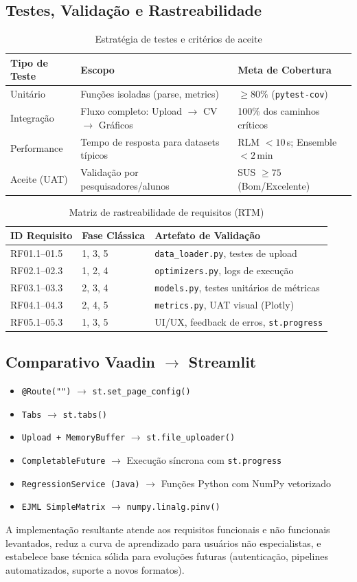 \documentclass[12pt,a4paper]{article}
\begin{document}
\subsection{Testes, Validação e Rastreabilidade}
\begin{table}[H]
\centering
\caption{Estratégia de testes e critérios de aceite}
\begin{tabularx}{\textwidth}{l X X}
\toprule
\textbf{Tipo de Teste} & \textbf{Escopo} & \textbf{Meta de Cobertura} \\
\midrule
Unitário & Funções isoladas (parse, metrics) & $\ge 80\%$ (\texttt{pytest-cov}) \\
Integração & Fluxo completo: Upload $\rightarrow$ CV $\rightarrow$ Gráficos & 100\% dos caminhos críticos \\
Performance & Tempo de resposta para datasets típicos & RLM $< 10\,$s; Ensemble $< 2\,$min \\
Aceite (UAT) & Validação por pesquisadores/alunos & SUS $\ge 75$ (Bom/Excelente) \\
\bottomrule
\end{tabularx}
\end{table}

\begin{table}[H]
\centering
\caption{Matriz de rastreabilidade de requisitos (RTM)}
\begin{tabularx}{\textwidth}{l l X}
\toprule
\textbf{ID Requisito} & \textbf{Fase Clássica} & \textbf{Artefato de Validação} \\
\midrule
RF01.1–01.5 & 1, 3, 5 & \texttt{data\_loader.py}, testes de upload \\
RF02.1–02.3 & 1, 2, 4 & \texttt{optimizers.py}, logs de execução \\
RF03.1–03.3 & 2, 3, 4 & \texttt{models.py}, testes unitários de métricas \\
RF04.1–04.3 & 2, 4, 5 & \texttt{metrics.py}, UAT visual (Plotly) \\
RF05.1–05.3 & 1, 3, 5 & UI/UX, feedback de erros, \texttt{st.progress} \\
\bottomrule
\end{tabularx}
\end{table}

\subsection{Comparativo Vaadin $\rightarrow$ Streamlit}
\begin{itemize}[leftmargin=1.5cm]
    \item \texttt{@Route("")} $\rightarrow$ \texttt{st.set\_page\_config()}
    \item \texttt{Tabs} $\rightarrow$ \texttt{st.tabs()}
    \item \texttt{Upload + MemoryBuffer} $\rightarrow$ \texttt{st.file\_uploader()}
    \item \texttt{CompletableFuture} $\rightarrow$ Execução síncrona com \texttt{st.progress}
    \item \texttt{RegressionService (Java)} $\rightarrow$ Funções Python com NumPy vetorizado
    \item \texttt{EJML SimpleMatrix} $\rightarrow$ \texttt{numpy.linalg.pinv()}
\end{itemize}

A implementação resultante atende aos requisitos funcionais e não funcionais levantados, reduz a curva de aprendizado para usuários não especialistas, e estabelece base técnica sólida para evoluções futuras (autenticação, pipelines automatizados, suporte a novos formatos).
\end{document}
